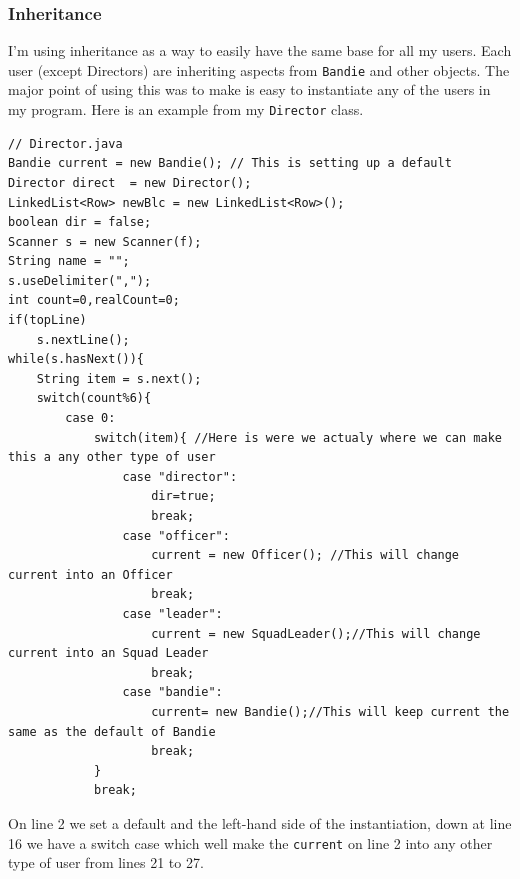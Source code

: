 \documentclass{article}
\begin{document}
\subsubsection{Inheritance}
I'm using inheritance as a way to easily have the same base for all my users. Each user (except Directors) are inheriting aspects from \verb|Bandie| and other objects. The major point of using this was to make is easy to instantiate any of the users in my program. Here is an example from my \verb|Director| class.
\begin{lstlisting}
// Director.java
Bandie current = new Bandie(); // This is setting up a default
Director direct  = new Director();
LinkedList<Row> newBlc = new LinkedList<Row>();
boolean dir = false;
Scanner s = new Scanner(f);
String name = "";
s.useDelimiter(",");
int count=0,realCount=0;
if(topLine)
	s.nextLine();
while(s.hasNext()){
	String item = s.next();
	switch(count%6){
		case 0:
			switch(item){ //Here is were we actualy where we can make this a any other type of user
				case "director":
					dir=true;
					break;
				case "officer":
					current = new Officer(); //This will change current into an Officer
					break;
				case "leader":
					current = new SquadLeader();//This will change current into an Squad Leader
					break;
				case "bandie":
					current= new Bandie();//This will keep current the same as the default of Bandie
					break;
			}
			break;
\end{lstlisting}
On line 2 we set a default and the left-hand side of the instantiation, down at line 16 we have a switch case which well make the \verb|current| on line 2 into any other type of user from lines 21 to 27. 
\end{document}
